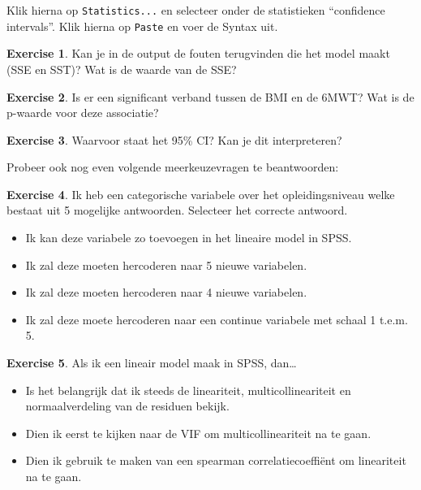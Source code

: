 \documentclass[
]{book}
\providecommand{\tightlist}{%
  \setlength{\itemsep}{0pt}\setlength{\parskip}{0pt}}
\theoremstyle{definition}
\theoremstyle{definition}
\theoremstyle{definition}
\newtheorem{exercise}{Exercise}[chapter]
\theoremstyle{definition}
\theoremstyle{remark}
\begin{document}
Klik hierna op \texttt{Statistics...} en selecteer onder de statistieken ``confidence intervals''. Klik hierna op \texttt{Paste} en voer de Syntax uit.

\begin{exercise}
Kan je in de output de fouten terugvinden die het model maakt (SSE en SST)? Wat is de waarde van de SSE?
\end{exercise}

\begin{exercise}
Is er een significant verband tussen de BMI en de 6MWT? Wat is de p-waarde voor deze associatie?
\end{exercise}

\begin{exercise}
Waarvoor staat het 95\% CI? Kan je dit interpreteren?
\end{exercise}

Probeer ook nog even volgende meerkeuzevragen te beantwoorden:

\begin{exercise}

Ik heb een categorische variabele over het opleidingsniveau welke bestaat uit 5 mogelijke antwoorden. Selecteer het correcte antwoord.

\begin{itemize}
\tightlist
\item
  Ik kan deze variabele zo toevoegen in het lineaire model in SPSS.
\item
  Ik zal deze moeten hercoderen naar 5 nieuwe variabelen.
\item
  Ik zal deze moeten hercoderen naar 4 nieuwe variabelen.
\item
  Ik zal deze moete hercoderen naar een continue variabele met schaal 1 t.e.m. 5.
\end{itemize}

\end{exercise}

\begin{exercise}

Als ik een lineair model maak in SPSS, dan\ldots{}

\begin{itemize}
\tightlist
\item
  Is het belangrijk dat ik steeds de lineariteit, multicollineariteit en normaalverdeling van de residuen bekijk.
\item
  Dien ik eerst te kijken naar de VIF om multicollineariteit na te gaan.
\item
  Dien ik gebruik te maken van een spearman correlatiecoeffiënt om lineariteit na te gaan.
\end{itemize}

\end{exercise}
\end{document}
